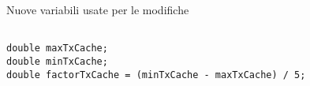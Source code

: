\begin{listing}[h]
    \caption{Nuove variabili usate per le modifiche}
    \label{code:variables_final2.0}
    \begin{verbatim}

double maxTxCache;
double minTxCache;
double factorTxCache = (minTxCache - maxTxCache) / 5;

    \end{verbatim}
\end{listing}